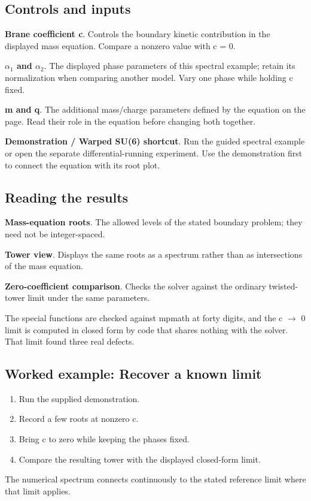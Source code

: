 \documentclass[11pt,a4paper]{article}
\begin{document}
\subsection*{Controls and inputs}
\textbf{Brane coefficient c}. Controls the boundary kinetic contribution in the displayed mass equation. Compare a nonzero value with c = 0.

\textbf{\ensuremath{\alpha}\ensuremath{{}_{1}} and \ensuremath{\alpha}\ensuremath{{}_{2}}}. The displayed phase parameters of this spectral example; retain its normalization when comparing another model. Vary one phase while holding c fixed.

\textbf{m and q}. The additional mass/charge parameters defined by the equation on the page. Read their role in the equation before changing both together.

\textbf{Demonstration / Warped SU(6) shortcut}. Run the guided spectral example or open the separate differential-running experiment. Use the demonstration first to connect the equation with its root plot.

\subsection*{Reading the results}
\textbf{Mass-equation roots}. The allowed levels of the stated boundary problem; they need not be integer-spaced.

\textbf{Tower view}. Displays the same roots as a spectrum rather than as intersections of the mass equation.

\textbf{Zero-coefficient comparison}. Checks the solver against the ordinary twisted-tower limit under the same parameters.

The special functions are checked against mpmath at forty digits, and the c \ensuremath{\rightarrow} 0 limit is computed in closed form by code that shares nothing with the solver. That limit found three real defects.
\subsection*{Worked example: Recover a known limit}
\begin{enumerate}
\item Run the supplied demonstration.
\item Record a few roots at nonzero c.
\item Bring c to zero while keeping the phases fixed.
\item Compare the resulting tower with the displayed closed-form limit.
\end{enumerate}
The numerical spectrum connects continuously to the stated reference limit where that limit applies.
\end{document}
